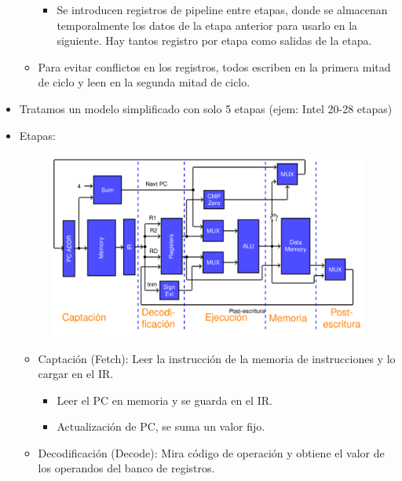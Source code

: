 \documentclass[12pt, twoside, openright]{report} %
\begin{document}
\begin{itemize}
\begin{itemize}
\begin{itemize}
      \item
        Se introducen registros de pipeline entre etapas, donde se
        almacenan temporalmente los datos de la etapa anterior para
        usarlo en la siguiente. Hay tantos registro por etapa como
        salidas de la etapa.
      \end{itemize}
    \item
      Para evitar conflictos en los registros, todos escriben en la
      primera mitad de ciclo y leen en la segunda mitad de ciclo.
    \end{itemize}
  \item
    Tratamos un modelo simplificado con solo 5 etapas (ejem: Intel 20-28
    etapas)
    \pagebreak
    \item
    Etapas:
    \begin{figure}[H]
      {\includegraphics[scale=.3]{Untitled 8.png}}
    \end{figure}
    \begin{itemize}
    
    \item
      Captación (Fetch): Leer la instrucción de la memoria de
      instrucciones y lo cargar en el IR.

      \begin{itemize}
      
      \item
        Leer el PC en memoria y se guarda en el IR.
      \item
        Actualización de PC, se suma un valor fijo.
      \end{itemize}
    \item
      Decodificación (Decode): Mira código de operación y obtiene el
      valor de los operandos del banco de registros.


\end{itemize}
\end{itemize}
\end{document}
